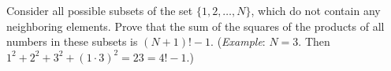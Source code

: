Consider all possible subsets of the set $\{1, 2, \ldots, N\}$, which do not contain any neighboring elements. Prove that the sum of the squares of the products of all numbers in these subsets is $(N + 1)! - 1$. (\emph{Example}: $N = 3$. Then $1^2 + 2^2 + 3^2 + (1 \cdot 3)^2 = 23 = 4! - 1$.)
